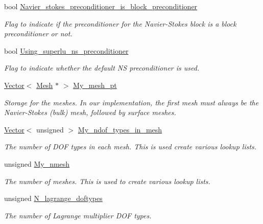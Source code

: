 \begin{DoxyCompactItemize}
bool \hyperlink{classoomph_1_1LagrangeEnforcedFlowPreconditioner_abd83bbbc271df1e5d5f5a96054b0742a}{Navier\+\_\+stokes\+\_\+preconditioner\+\_\+is\+\_\+block\+\_\+preconditioner}
\begin{DoxyCompactList}\small\item\em Flag to indicate if the preconditioner for the Navier-\/\+Stokes block is a block preconditioner or not. \end{DoxyCompactList}\item 
bool \hyperlink{classoomph_1_1LagrangeEnforcedFlowPreconditioner_ab447b9d1830e1b470e090efa13201844}{Using\+\_\+superlu\+\_\+ns\+\_\+preconditioner}
\begin{DoxyCompactList}\small\item\em Flag to indicate whether the default NS preconditioner is used. \end{DoxyCompactList}\item 
\hyperlink{classoomph_1_1Vector}{Vector}$<$ \hyperlink{classoomph_1_1Mesh}{Mesh} $\ast$ $>$ \hyperlink{classoomph_1_1LagrangeEnforcedFlowPreconditioner_ae9f26444d532bd55864f3d38bf369108}{My\+\_\+mesh\+\_\+pt}
\begin{DoxyCompactList}\small\item\em Storage for the meshes. In our implementation, the first mesh must always be the Navier-\/\+Stokes (bulk) mesh, followed by surface meshes. \end{DoxyCompactList}\item 
\hyperlink{classoomph_1_1Vector}{Vector}$<$ unsigned $>$ \hyperlink{classoomph_1_1LagrangeEnforcedFlowPreconditioner_a6bbfdf74c3cdc461831f03858f9cb1b7}{My\+\_\+ndof\+\_\+types\+\_\+in\+\_\+mesh}
\begin{DoxyCompactList}\small\item\em The number of D\+OF types in each mesh. This is used create various lookup lists. \end{DoxyCompactList}\item 
unsigned \hyperlink{classoomph_1_1LagrangeEnforcedFlowPreconditioner_a862f54ac1db0001ebcd205b1ecc8ad08}{My\+\_\+nmesh}
\begin{DoxyCompactList}\small\item\em The number of meshes. This is used to create various lookup lists. \end{DoxyCompactList}\item 
unsigned \hyperlink{classoomph_1_1LagrangeEnforcedFlowPreconditioner_a0d62cc72563ff5a2feae895d91ebca1e}{N\+\_\+lagrange\+\_\+doftypes}
\begin{DoxyCompactList}\small\item\em The number of Lagrange multiplier D\+OF types. \end{DoxyCompactList}\item 

\end{DoxyCompactItemize}
